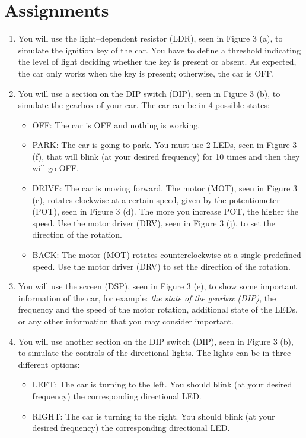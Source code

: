 \section{Assignments}
\label{sec:assignments}
\begin{enumerate}
    \item You will use the light–dependent resistor (LDR), seen in Figure 3 (a), to simulate the ignition key of the car. You have to define a threshold indicating the level of light deciding whether the key is present or absent. As expected, the car only works when the key is present; otherwise, the car is OFF.
    \item You will use a section on the DIP switch (DIP), seen in Figure 3 (b), to simulate the gearbox of your car. The car can be in 4 possible states:
    \begin{itemize}
        \item OFF: The car is OFF and nothing is working.
        \item PARK: The car is going to park. You must use 2 LEDs, seen in Figure 3 (f), that will blink (at your desired frequency) for 10 times and then they will go OFF.
        \item DRIVE: The car is moving forward. The motor (MOT), seen in Figure 3 (c), rotates clockwise at a certain speed, given by the potentiometer (POT), seen in Figure 3 (d). The more you increase POT, the higher the speed. Use the motor driver (DRV), seen in Figure 3 (j), to set the direction of the rotation.
        \item BACK: The motor (MOT) rotates counterclockwise at a single predefined speed. Use the motor driver (DRV) to set the direction of the rotation.
    \end{itemize}
    \item You will use the screen (DSP), seen in Figure 3 (e), to show some important information of the car, for example: \textit{the state of the gearbox (DIP)}, the frequency and the speed of the motor rotation, additional state of the LEDs, or any other information that you may consider important.
    \item You will use another section on the DIP switch (DIP), seen in Figure 3 (b), to simulate the controls of the directional lights. The lights can be in three different options:
    \begin{itemize}
        \item LEFT: The car is turning to the left. You should blink (at your desired frequency) the corresponding directional LED.
        \item RIGHT: The car is turning to the right. You should blink (at your desired frequency) the corresponding directional LED.

\end{itemize}
\end{enumerate}
